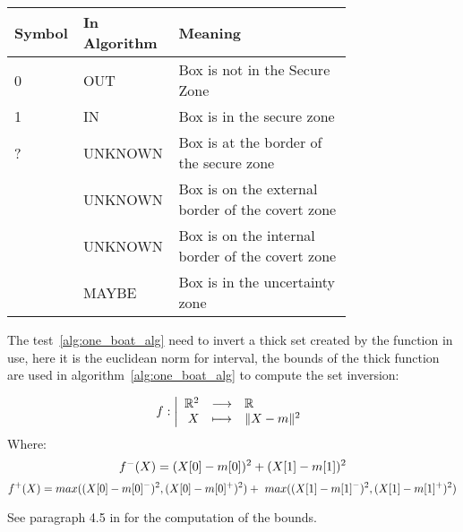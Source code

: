 \begin{center}
\begin{tabular}{|m{0.10\linewidth}|m{0.15\linewidth}|m{0.5\linewidth}|}
\hline
 Symbol & In Algorithm  & Meaning  \\ \hline
 0 & OUT & Box is not in the Secure Zone  \\ \hline
 1 & IN & Box is in the secure zone \\ \hline
 ? & UNKNOWN & Box is at the border of the secure zone  \\ \hline
[0,?]& UNKNOWN  & Box is on the external border of the covert zone \\ \hline
[?,1]& UNKNOWN  & Box is on the internal border of the covert zone\\ \hline
[0,1]& MAYBE  & Box is in the uncertainty zone\\ \hline
   
\end{tabular}
\end{center}

The test~\ref{alg:one_boat_alg} need to invert a thick set created by the function in use, here it is the euclidean norm for interval, the bounds of the thick function are used in algorithm~\ref{alg:one_boat_alg} to compute the set inversion:


\begin{displaymath}
f:
\left|
  \begin{array}{rcl}
     \mathbb{R^{\textnormal{\ensuremath{2}}}}  & \longrightarrow &\mathbb{R} \\
    X & \longmapsto & \|X-m\|^{\textnormal{\ensuremath{2}}}\\
  \end{array}
\right.
\end{displaymath}
Where:
 \[f^{\textnormal{\ensuremath{-}}}(X) = (X[0]-m[0])^{\textnormal{\ensuremath{2}}}+(X[1]-m[1])^{\textnormal{\ensuremath{2}}}\] 
\[f^{\textnormal{\ensuremath{+}}}(X) = max((X[0]-m[0]^{\textnormal{\ensuremath{-}}})^{\textnormal{\ensuremath{2}}},(X[0]-m[0]^{\textnormal{\ensuremath{+}}})^{\textnormal{\ensuremath{2}}}) + \
                  max((X[1]-m[1]^{\textnormal{\ensuremath{-}}})^{\textnormal{\ensuremath{2}}},(X[1]-m[1]^{\textnormal{\ensuremath{+}}})^{\textnormal{\ensuremath{2}}})\]


See paragraph 4.5 in \cite{jaulin2010resolution} for the computation of the bounds.

